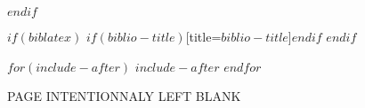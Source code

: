 \documentclass[$if(fontsize)$$fontsize$,$endif$$if(lang)$$babel-lang$,$endif$$if(papersize)$$papersize$paper,$endif$$for(classoption)$$classoption$$sep$,$endfor$]{$documentclass$}
\begin{document}
	\newpage
$endif$




$if(biblatex)$
    \printbibliography$if(biblio-title)$[title=$biblio-title$]$endif$
    \newpage
$endif$

$for(include-after)$
    $include-after$
    \newpage
$endfor$

\newpage
\thispagestyle{empty}
\clearpage
\vspace*{\fill}
\begin{center}
\begin{minipage}{.6\textwidth}
\centering PAGE INTENTIONNALY LEFT BLANK
\end{minipage}
\end{center}
\vfill %
\clearpage
\end{document}
